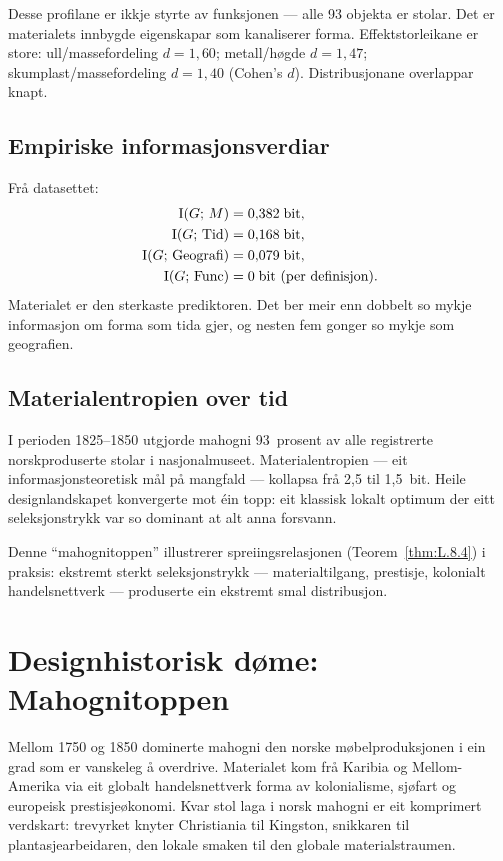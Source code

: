 Desse profilane er ikkje styrte av funksjonen --- alle 93 objekta
er stolar. Det er materialets innbygde eigenskapar som kanaliserer
forma. Effektstorleikane er store: ull/massefordeling $d = 1{,}60$;
metall/høgde $d = 1{,}47$; skumplast/massefordeling $d = 1{,}40$
(Cohen's $d$). Distribusjonane overlappar knapt.

\subsection{Empiriske informasjonsverdiar}

Frå datasettet:
\begin{align*}
  \operatorname{I}(G;\, M) &= 0{,}382 \;\text{bit}, \\
  \operatorname{I}(G;\, \mathrm{Tid}) &= 0{,}168 \;\text{bit}, \\
  \operatorname{I}(G;\, \mathrm{Geografi}) &= 0{,}079 \;\text{bit}, \\
  \operatorname{I}(G;\, \mathrm{Func}) &= 0 \;\text{bit (per definisjon).}
\end{align*}
Materialet er den sterkaste prediktoren. Det ber meir enn dobbelt
so mykje informasjon om forma som tida gjer, og nesten fem gonger
so mykje som geografien.

\subsection{Materialentropien over tid}

I perioden 1825--1850 utgjorde mahogni 93~prosent av alle
registrerte norskproduserte stolar i nasjonalmuseet. Material\-entropien --- eit informasjonsteoretisk mål på mangfald --- kollapsa
frå 2{,}5 til 1{,}5~bit. Heile designlandskapet konvergerte mot
éin topp: eit klassisk lokalt optimum der eitt seleksjonstrykk var
so dominant at alt anna forsvann.

Denne ``mahognitoppen'' illustrerer spreiingsrelasjonen
(Teorem~\ref{thm:L.8.4}) i praksis: ekstremt sterkt
seleksjonstrykk --- materialtilgang, prestisje, kolonialt
handelsnettverk --- produserte ein ekstremt smal distribusjon.


\section{Designhistorisk døme: Mahognitoppen}

Mellom 1750 og 1850 dominerte mahogni den norske møbelproduksjonen
i ein grad som er vanskeleg å overdrive. Materialet kom frå
Karibia og Mellom-Amerika via eit globalt handelsnettverk forma av
kolonialisme, sjøfart og europeisk prestisjeøkonomi. Kvar stol
laga i norsk mahogni er eit komprimert verdskart: trevyrket
knyter Christiania til Kingston, snikkaren til plantasjearbeidaren,
den lokale smaken til den globale materialstraumen.

